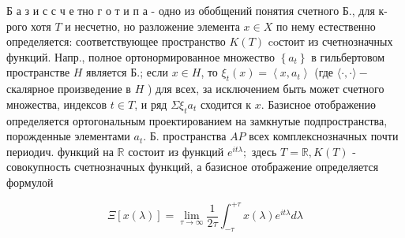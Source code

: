\documentclass[10pt]{article}
\begin{document}
Б а з и с с ч е тно г о т и п а - одно из обобщений понятия счетного Б., для к-рого хотя $T$ и несчетно, но разложение элемента $x \in X$ по нему естественно определяется: соответствующее пространство $K(T)$ coстоит из счетнозначных функций. Напр., полное ортонормированное множество $\left\{a_{t}\right\}$ в гильбертовом пространстве $H$ является Б.; если $x \in H$, то $\xi_{t}(x)=\left\langle x, a_{t}\right\rangle$ (где $\langle\cdot, \cdot\rangle-$ скалярное произведение в $H$ ) для всех, за исключением быть может счетного множества, индексов $t \in T$, и ряд $\Sigma \xi_{t} a_{t}$ сходится к $x$. Базисное отображениө определяется ортогональным проектированием на замкнутые подпространства, порожденные элементами $a_{t}$. Б. пространства $A P$ всех комплекснозначных почти периодич. функций на $\mathbb{R}$ состоит из функций $e^{i t \lambda} ;$ здесь $T=\mathbb{R}, K(T)$ - совокупность счетнозначных функций, а базисное отображение определяется формулой



\[

\Xi[x(\lambda)]=\lim _{\tau \rightarrow \infty} \frac{1}{2 \tau} \int_{-\tau}^{+\tau} x(\lambda) e^{i t \lambda} d \lambda

\]
\end{document}
